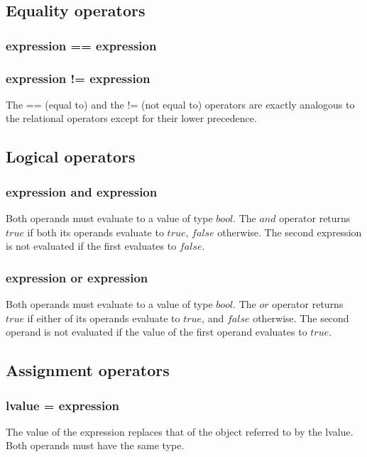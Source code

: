 \begin{homeworkProblem}
    \subsection{Equality operators}

    \subsubsection{expression == expression}
    \subsubsection{expression != expression}
    The == (equal to) and the != (not equal to) operators are exactly analogous to the relational operators except for their lower precedence.

    \subsection{Logical operators}

    \subsubsection{expression and expression}
    Both operands must evaluate to a value of type $bool$. The $and$ operator returns $true$ if both its operands evaluate to $true$, $false$ otherwise. The second expression is not evaluated if the first evaluates to $false$.

    \subsubsection{expression or expression}
    Both operands must evaluate to a value of type $bool$. The $or$ operator returns $true$ if either of its operands evaluate to $true$, and $false$ otherwise. The second operand is not evaluated if the value of the first operand evaluates to $true$.

    \subsection{Assignment operators}

    \subsubsection{lvalue = expression}
    The value of the expression replaces that of the object referred to by the lvalue. Both operands must have the same type.
    \end{homeworkProblem}
